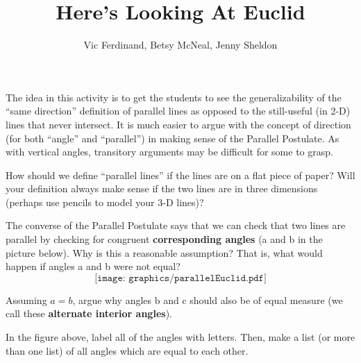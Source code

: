 \documentclass{ximera}
\title{Here's Looking At Euclid}
\author{Vic Ferdinand, Betsy McNeal, Jenny Sheldon}
\begin{document}
\begin{abstract}
\end{abstract}

\maketitle


\begin{instructorIntro}
The idea in this activity is to get the students to see the generalizability of the ``same direction'' definition of parallel lines as opposed to the still-useful (in 2-D) lines that never intersect.  It is much easier to argue with the concept of direction (for both ``angle'' and ``parallel'') in making sense of the Parallel Postulate.  As with vertical angles, transitory arguments may be difficult for some to grasp.
\end{instructorIntro}


\begin{question}
How should we define ``parallel lines'' if the lines are on a flat piece of paper?  Will your definition always make sense if the two lines are in three dimensions (perhaps use pencils to model your 3-D lines)?
\end{question}









\begin{problem} \label{Euclid1}
The converse of the Parallel Postulate says that we can check that two lines are parallel by checking for congruent {\bf corresponding angles} (a and b in the picture below).  Why is this a reasonable assumption? That is, what would happen if angles a and b were not equal?  
\[
\texttt{[image: graphics/parallelEuclid.pdf]}
\]
\end{problem}







\begin{problem}
Assuming $a = b$, argue why angles b and c should also be of equal measure (we call these {\bf alternate interior angles}).
\end{problem}

\begin{problem}
In the figure above, label all of the angles with letters.  Then, make a list (or more than one list) of all angles which are equal to each other.
\end{problem}
\end{document}
